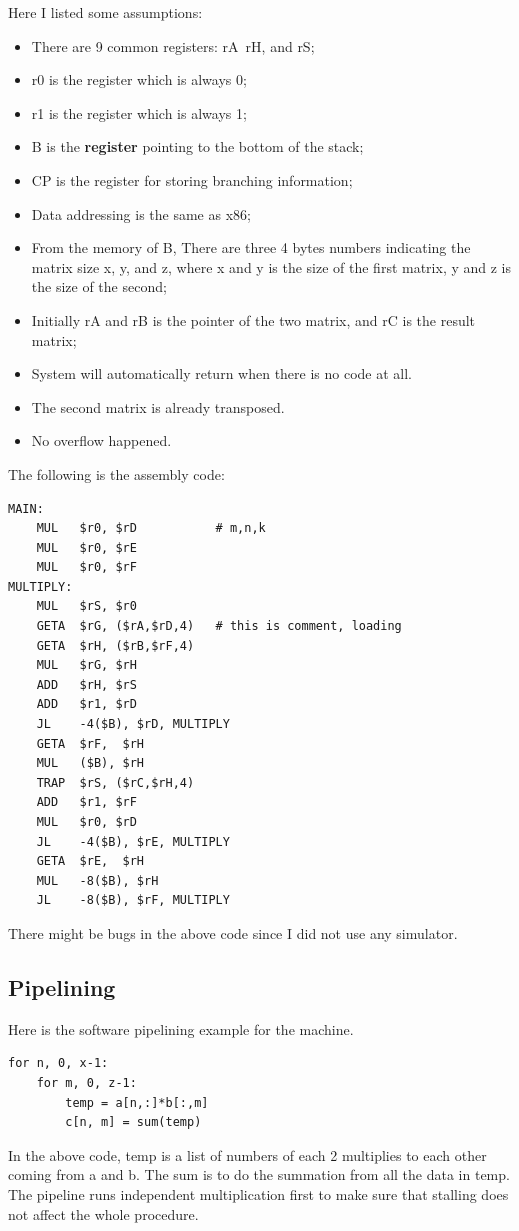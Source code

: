 \documentclass[11pt]{article}
\begin{document}
Here I listed some assumptions:
\begin{itemize}
\item There are 9 common registers: rA~rH, and rS;
\item r0 is the register which is always 0;
\item r1 is the register which is always 1;
\item B is the {\bf register} pointing to the bottom of the stack;
\item CP is the register for storing branching information; 
\item Data addressing is the same as x86;
\item From the memory of B, There are three 4 bytes numbers indicating the matrix size x, y, and z, where x and y is the size of the first matrix, 
y and z is the size of the second;
\item Initially rA and rB is the pointer of the two matrix, and rC is the result matrix;
\item System will automatically return when there is no code at all. 
\item The second matrix is already transposed. 
\item No overflow happened. 
\end{itemize}

The following is the assembly code:
\begin{verbatim}
MAIN:
    MUL   $r0, $rD           # m,n,k
    MUL   $r0, $rE
    MUL   $r0, $rF
MULTIPLY:
    MUL   $rS, $r0
    GETA  $rG, ($rA,$rD,4)   # this is comment, loading 
    GETA  $rH, ($rB,$rF,4)
    MUL   $rG, $rH
    ADD   $rH, $rS
    ADD   $r1, $rD
    JL    -4($B), $rD, MULTIPLY
    GETA  $rF,  $rH
    MUL   ($B), $rH
    TRAP  $rS, ($rC,$rH,4)
    ADD   $r1, $rF
    MUL   $r0, $rD
    JL    -4($B), $rE, MULTIPLY
    GETA  $rE,  $rH
    MUL   -8($B), $rH
    JL    -8($B), $rF, MULTIPLY
\end{verbatim}

There might be bugs in the above code since I did not use any simulator. 


\subsection{Pipelining}
\label{sec:orgheadline10}

Here is the software pipelining example for the machine.

\begin{verbatim}
for n, 0, x-1:
    for m, 0, z-1:
        temp = a[n,:]*b[:,m]
        c[n, m] = sum(temp)
\end{verbatim}

In the above code, temp is a list of numbers of each 2 multiplies to each other coming from a and b. 
The sum is to do the summation from all the data in temp. 
The pipeline runs independent multiplication first to make sure that stalling does not affect the whole procedure. 
\end{document}

